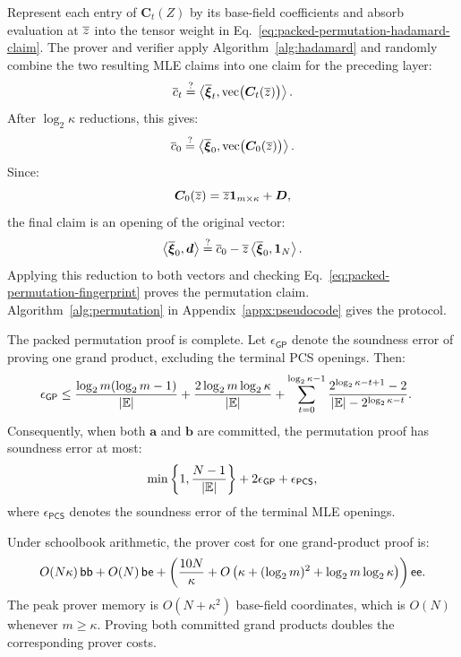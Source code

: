 Represent each entry of \(\bm C_t(Z)\) by its base-field
coefficients and absorb evaluation at \(\overline{z}\) into the
tensor weight in
Eq.~\eqref{eq:packed-permutation-hadamard-claim}. The prover and
verifier apply Algorithm~\ref{alg:hadamard} and randomly combine
the two resulting MLE claims into one claim for the preceding layer:
\begin{equation*}
    \overline{c}_t
    \mathrel{\overset{\mathrm{?}}{=}}
    \left\langle
        \overline{\bm\xi}_t,
        \operatorname{vec}
        \bigl(\bm C_t(\overline{z})\bigr)
    \right\rangle.
\end{equation*}
After \(\log_2\kappa\) reductions, this gives:
\[
    \overline{c}_0
    \mathrel{\overset{\mathrm{?}}{=}}
    \left\langle
        \overline{\bm\xi}_0,
        \operatorname{vec}
        \bigl(\bm C_0(\overline{z})\bigr)
    \right\rangle.
\]
Since:
\[
    \bm C_0(\overline{z})
    =
    \overline{z}\bm 1_{m\times\kappa}+\bm D,
\]
the final claim is an opening of the original vector:
\begin{equation*}
    \left\langle
        \overline{\bm\xi}_0,\bm d
    \right\rangle
    \mathrel{\overset{\mathrm{?}}{=}}
    \overline{c}_0
    -
    \overline{z}
    \left\langle
        \overline{\bm\xi}_0,\bm 1_N
    \right\rangle.
\end{equation*}
Applying this reduction to both vectors and checking
Eq.~\eqref{eq:packed-permutation-fingerprint} proves the permutation
claim. Algorithm~\ref{alg:permutation} in
Appendix~\ref{appx:pseudocode} gives the protocol.

\begin{proposition}
\label{proposition:permutation-complexity}
The packed permutation proof is complete. Let
\(\epsilon_{\mathsf{GP}}\) denote the soundness error of proving
one grand product, excluding the terminal PCS openings. Then:
\[
\begin{aligned}
    \epsilon_{\mathsf{GP}}
    \leq\;&
    \frac{
        \log_2m(\log_2m-1)
    }{
        |\mathbb{E}|
    }
    +
    \frac{
        2\log_2m\log_2\kappa
    }{
        |\mathbb{E}|
    }
    +
    \sum_{t=0}^{\log_2\kappa-1}
    \frac{
        2^{\log_2\kappa-t+1}-2
    }{
        |\mathbb{E}|
        -
        2^{\log_2\kappa-t}
    }.
\end{aligned}
\]
Consequently, when both \(\bm a\) and \(\bm b\) are committed,
the permutation proof has soundness error at most:
\[
    \min\left\{
        1,
        \frac{N-1}{|\mathbb{E}|}
    \right\}
    +
    2\epsilon_{\mathsf{GP}}
    +
    \epsilon_{\mathsf{PCS}},
\]
where \(\epsilon_{\mathsf{PCS}}\) denotes the soundness error of
the terminal MLE openings.

Under schoolbook arithmetic, the prover cost for one
grand-product proof is:
\[
    O(N\kappa)\,\mathsf{bb}
    +
    O(N)\,\mathsf{be}
    +
    \left(
        \frac{10N}{\kappa}
        +
        O\left(
            \kappa
            +
            (\log_2m)^2
            +
            \log_2m\log_2\kappa
        \right)
    \right)\mathsf{ee}.
\]
The peak prover memory is \(O(N+\kappa^2)\) base-field
coordinates, which is \(O(N)\) whenever \(m\geq\kappa\).
Proving both committed grand products doubles the corresponding
prover costs.
\end{proposition}

